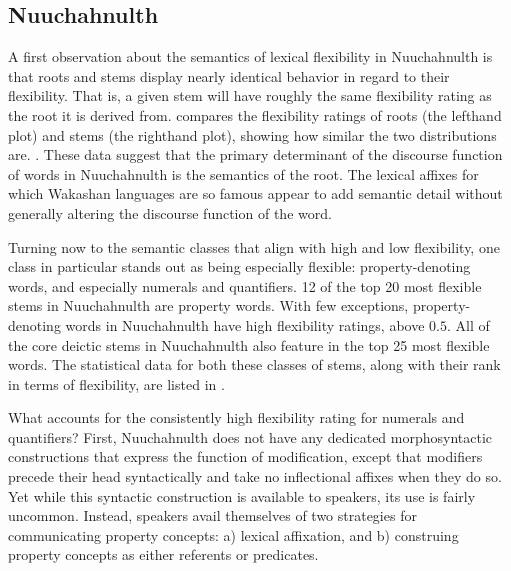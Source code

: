 \subsection{Nuuchahnulth}
\label{sec:4.6.2}

A first observation about the semantics of lexical flexibility in Nuuchahnulth is that roots and stems display nearly identical behavior in regard to their flexibility. That is, a given stem will have roughly the same flexibility rating as the root it is derived from.  compares the flexibility ratings of roots (the lefthand plot) and stems (the righthand plot), showing how similar the two distributions are. . These data suggest that the primary determinant of the discourse function of words in Nuuchahnulth is the semantics of the root. The lexical affixes for which Wakashan languages are so famous appear to add semantic detail without generally altering the discourse function of the word.


Turning now to the semantic classes that align with high and low flexibility, one class in particular stands out as being especially flexible: property-denoting words, and especially numerals and quantifiers. 12 of the top 20 most flexible stems in Nuuchahnulth are property words. With few exceptions, property-denoting words in Nuuchahnulth have high flexibility ratings, above $0.5$. All of the core deictic stems in Nuuchahnulth also feature in the top 25 most flexible words. The statistical data for both these classes of stems, along with their rank in terms of flexibility, are listed in .


What accounts for the consistently high flexibility rating for numerals and quantifiers? First, Nuuchahnulth does not have any dedicated morphosyntactic constructions that express the function of modification, except that modifiers precede their head syntactically and take no inflectional affixes when they do so. Yet while this syntactic construction is available to speakers, its use is fairly uncommon. Instead, speakers avail themselves of two strategies for communicating property concepts: a) lexical affixation, and b) construing property concepts as either referents or predicates.

